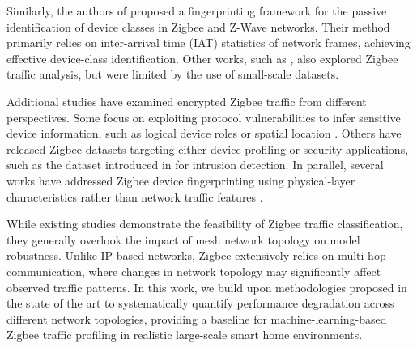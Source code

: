 Similarly, the authors of \cite{ziot2020} proposed a fingerprinting framework for the passive identification of device classes in Zigbee and Z-Wave networks. Their method primarily relies on inter-arrival time (IAT) statistics of network frames, achieving effective device-class identification. Other works, such as \cite{Peek-a-Boo2018,antonio}, also explored Zigbee traffic analysis, but were limited by the use of small-scale datasets.

Additional studies have examined encrypted Zigbee traffic from different perspectives. Some focus on exploiting protocol vulnerabilities to infer sensitive device information, such as logical device roles \cite{zigator20} or spatial location \cite{Localize2022}. Others have released Zigbee datasets targeting either device profiling \cite{iot_dataset_paper} or security applications, such as the dataset introduced in \cite{ZBDS2023} for intrusion detection. In parallel, several works have addressed Zigbee device fingerprinting using physical-layer characteristics rather than network traffic features \cite{27patel2015non,28bihl2016feature,30dubendorfer2013zigbee}.

While existing studies demonstrate the feasibility of Zigbee traffic classification, they generally overlook the impact of mesh network topology on model robustness. Unlike IP-based networks, Zigbee extensively relies on multi-hop communication, where changes in network topology may significantly affect observed traffic patterns. In this work, we build upon methodologies proposed in the state of the art to systematically quantify performance degradation across different network topologies, providing a baseline for machine-learning-based Zigbee traffic profiling in realistic large-scale smart home environments.

